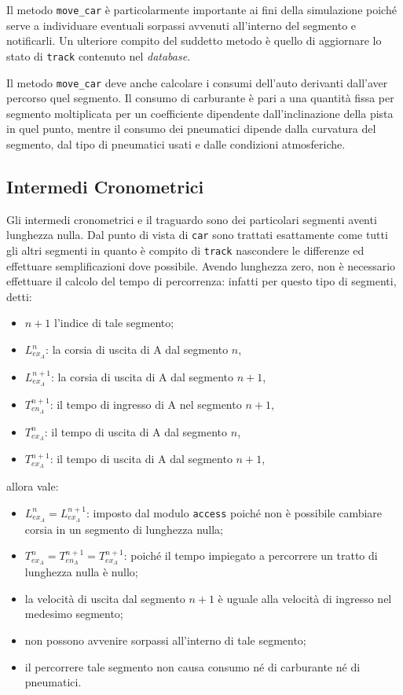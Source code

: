 \documentclass[11pt,a4paper]{report}
\newcommand{\fun}[1]{\texttt{#1}}
\begin{document}
Il metodo \fun{move\_car} è particolarmente importante ai fini della simulazione poiché serve a individuare eventuali sorpassi avvenuti all'interno del segmento e notificarli. Un ulteriore compito del suddetto metodo è quello di aggiornare lo stato di \texttt{track} contenuto nel \textit{database}.

Il metodo \fun{move\_car} deve anche calcolare i consumi dell'auto derivanti dall'aver percorso quel segmento.
Il consumo di carburante è pari a una quantità fissa per segmento moltiplicata per un coefficiente dipendente dall'inclinazione della pista in quel punto, mentre il consumo dei pneumatici dipende dalla curvatura del segmento, dal tipo di pneumatici usati e dalle condizioni atmosferiche.

\subsection{Intermedi Cronometrici}
Gli intermedi cronometrici e il traguardo sono dei particolari segmenti aventi lunghezza nulla. Dal punto di vista di \texttt{car} sono trattati esattamente come tutti gli altri segmenti in quanto è compito di \texttt{track} nascondere le differenze ed effettuare semplificazioni dove possibile. Avendo lunghezza zero, non è necessario effettuare il calcolo del tempo di percorrenza: infatti per questo tipo di segmenti, detti:
\begin{itemize}
\item $n+1$ l'indice di tale segmento;
\item $L_{ex_A}^{n}$: la corsia di uscita di A dal segmento $n$,
\item $L_{ex_A}^{n+1}$: la corsia di uscita di A dal segmento $n+1$,
\item $T_{en_A}^{n+1}$: il tempo di ingresso di A nel segmento $n+1$,
\item $T_{ex_A}^{n}$: il tempo di uscita di A dal segmento $n$,
\item $T_{ex_A}^{n+1}$: il tempo di uscita di A dal segmento $n+1$,
\end{itemize}
allora vale:
\begin{itemize}
\item $L_{ex_A}^{n} = L_{ex_A}^{n+1}$: imposto dal modulo \texttt{access} poiché non è possibile cambiare corsia in un segmento di lunghezza nulla;
\item $T_{ex_A}^{n} = T_{en_A}^{n+1} = T_{ex_A}^{n+1}$: poiché il tempo impiegato a percorrere un tratto di lunghezza nulla è nullo;
\item la velocità di uscita dal segmento $n+1$ è uguale alla velocità di ingresso nel medesimo segmento;
\item non possono avvenire sorpassi all'interno di tale segmento;
\item il percorrere tale segmento non causa consumo né di carburante né di pneumatici.
\end{itemize}
\end{document}
